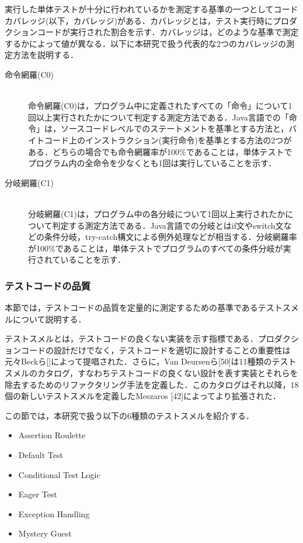 \documentclass[12pt]{jarticle} %
\begin{document}
実行した単体テストが十分に行われているかを測定する基準の一つとしてコードカバレッジ(以下，カバレッジ)がある．カバレッジとは，テスト実行時にプロダクションコードが実行された割合を示す．カバレッジは，どのような基準で測定するかによって値が異なる．以下に本研究で扱う代表的な2つのカバレッジの測定方法を説明する．

\begin{description}
\item[命令網羅(C0)]~\\
命令網羅(C0)は，プログラム中に定義されたすべての「命令」について1回以上実行されたかについて判定する測定方法である．Java言語での「命令」は，ソースコードレベルでのステートメントを基準とする方法と，バイトコード上のインストラクション(実行命令)を基準とする方法の2つがある．どちらの場合でも命令網羅率が100\%であることは，単体テストでプログラム内の全命令を少なくとも1回は実行していることを示す．
\item[分岐網羅(C1)]~\\
分岐網羅(C1)は，プログラム中の各分岐について1回以上実行されたかについて判定する測定方法である．Java言語での分岐とはif文やswitch文などの条件分岐，try-catch構文による例外処理などが相当する．分岐網羅率が100\%であることは，単体テストでプログラムのすべての条件分岐が実行されていることを示す．
\end{description}




\subsubsection{テストコードの品質}

本節では，テストコードの品質を定量的に測定するための基準であるテストスメルについて説明する．

テストスメルとは，テストコードの良くない実装を示す指標である．プロダクションコードの設計だけでなく，テストコードを適切に設計することの重要性は元々Beckら[]によって提唱された．さらに，Van Deursenら[50]は11種類のテストスメルのカタログ，すなわちテストコードの良くない設計を表す実装とそれらを除去するためのリファクタリング手法を定義した．このカタログはそれ以降，18個の新しいテストスメルを定義したMeszaros [42]によってより拡張された．

この節では，本研究で扱う以下の6種類のテストスメルを紹介する．

\begin{itemize}
\item Assertion Roulette
\item Default Test
\item Conditional Test Logic
\item Eager Test
\item Exception Handling
\item Mystery Guest
\end{itemize}
\end{document}
